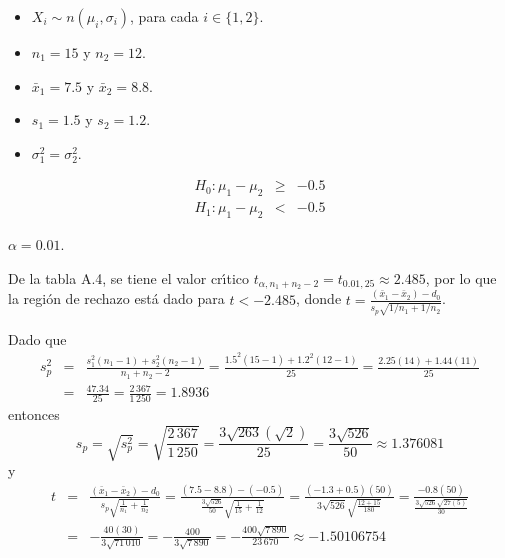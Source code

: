 \begin{solucion}
 \begin{datos}
  $\phantom{0}$
  \begin{itemize}
   \item $X_i \sim n\left( \mu_i, \sigma_i \right)$, para cada $i \in \{ 1, 2 \}$.
   \item $n_1 = 15$ y $n_2 = 12$.
   \item $\bar{x}_1 = 7.5$ y $\bar{x}_2 = 8.8$.
   \item $s_1 = 1.5$ y $s_2 = 1.2$.
   \item $\sigma_1^2 = \sigma_2^2$.
  \end{itemize}
 \end{datos}

 \begin{hipotesis}
  \begin{eqnarray*}
   H_0: \mu_1 - \mu_2 & \geq & -0.5 \\
   H_1: \mu_1 - \mu_2 & < &  -0.5
  \end{eqnarray*}
 \end{hipotesis}

 \begin{significancia}
  $\alpha = 0.01$.
 \end{significancia}

 \begin{region}
  De la tabla A.4, se tiene el valor cr\'{\i}tico $t_{\alpha,n_1+n_2-2} = t_{0.01,25} \approx 2.485$, por lo que la regi\'on de rechazo est\'a dado para $t < -2.485$, donde $t = \frac{\left( \bar{x}_1 - \bar{x}_2\right) -d_0}{s_p\sqrt{1/n_1 + 1/n_2}}$.
 \end{region}

 \begin{estadistico}
  Dado que
  \begin{eqnarray*}
   s_p^2 & = & \frac{s_1^2\left( n_1 - 1\right) + s_2^2\left( n_2 - 1 \right)}{n_1 + n_2 - 2} = \frac{1.5^2(15 - 1) + 1.2^2(12 - 1)}{25} = \frac{2.25(14) + 1.44(11)}{25} \\
   & = & \frac{47.34}{25} = \frac{2\,367}{1\,250} = 1.8936
  \end{eqnarray*}
  entonces
  \begin{equation*}
   s_p = \sqrt{s_p^2} = \sqrt{\frac{2\,367}{1\,250}} = \frac{3\sqrt{263}\left( \sqrt{2} \right)}{25} = \frac{3\sqrt{526}}{50} \approx 1.376081
  \end{equation*}
  y
  \begin{eqnarray*}
   t & = & \frac{\left( \bar{x}_1 - \bar{x}_2 \right) - d_0}{s_p\sqrt{\frac{1}{n_1} + \frac{1}{n_2}}} = \frac{(7.5-8.8)-(-0.5)}{\frac{3\sqrt{526}}{50} \sqrt{\frac{1}{15} + \frac{1}{12}}} = \frac{(-1.3 + 0.5)(50)}{3\sqrt{526}\sqrt{\frac{12+15}{180}}} = \frac{-0.8(50)}{\frac{3\sqrt{526}\sqrt{27(5)}}{30}} \\
   & = & -\frac{40(30)}{3\sqrt{71\,010}} = - \frac{400}{3\sqrt{7\,890}} = -\frac{400\sqrt{7\,890}}{23\,670} \approx -1.50106754
  \end{eqnarray*}
 \end{estadistico}


\end{solucion}

